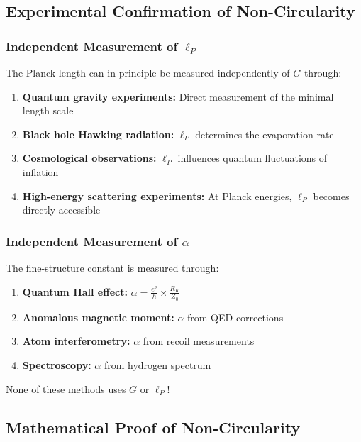 \documentclass[12pt,a4paper]{article}
\theoremstyle{definition}
\begin{document}
	\subsection{Experimental Confirmation of Non-Circularity}
	
	\subsubsection{Independent Measurement of $\ell_P$}
	
	The Planck length can in principle be measured independently of $G$ through:
	
	\begin{enumerate}
		\item \textbf{Quantum gravity experiments:} Direct measurement of the minimal length scale
		\item \textbf{Black hole Hawking radiation:} $\ell_P$ determines the evaporation rate
		\item \textbf{Cosmological observations:} $\ell_P$ influences quantum fluctuations of inflation
		\item \textbf{High-energy scattering experiments:} At Planck energies, $\ell_P$ becomes directly accessible
	\end{enumerate}
	
	\subsubsection{Independent Measurement of $\alpha$}
	
	The fine-structure constant is measured through:
	
	\begin{enumerate}
		\item \textbf{Quantum Hall effect:} $\alpha = \frac{e^2}{h} \times \frac{R_K}{Z_0}$
		\item \textbf{Anomalous magnetic moment:} $\alpha$ from QED corrections
		\item \textbf{Atom interferometry:} $\alpha$ from recoil measurements
		\item \textbf{Spectroscopy:} $\alpha$ from hydrogen spectrum
	\end{enumerate}
	
	None of these methods uses $G$ or $\ell_P$!
	
	\subsection{Mathematical Proof of Non-Circularity}
	
\end{document}
